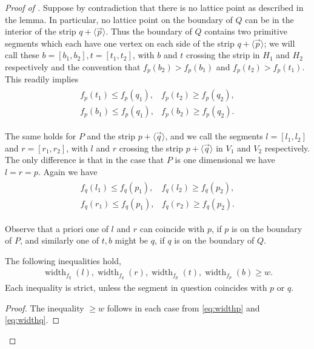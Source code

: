 \documentclass[12pt]{article}
\newcommand{\width}{\operatorname{width}}
\newcommand{\vecline}[1]{\langle \vec #1 \rangle}
\begin{document}
\begin{proof}[Proof of ]
Suppose by contradiction that there is no lattice point as described in the lemma. In particular, no lattice point on the boundary of $Q$ can be in the interior of the strip $q + \vecline p$.  Thus the boundary of $Q$ contains two primitive segments which each have one vertex on each side of the strip $q + \vecline p$; we will call these  $b=[b_1, b_2], t=[t_1, t_2]$, with $b$ and $t$ crossing the strip in $H_1$ and $H_2$ respectively and the convention that $f_p(b_2) >f_p(b_1)$ and $f_p(t_2) >f_p(t_1)$. This readily implies 
\begin{gather}
\label{eq:widthq}
\begin{array}{cc}
f_p(t_1) \leq f_p(q_1), &
f_p(t_2) \geq f_p(q_2), \\
f_p(b_1) \leq f_p(q_1), &
f_p(b_2) \geq f_p(q_2).
\end{array}
\end{gather}


The same holds for $P$ and the strip $p+\vecline q$, and we call the segments 
$l=[l_1, l_2]$ and $r=[r_1, r_2]$, with $l$ and $r$ crossing the strip $p + \vecline q$  in $V_1$ and $ V_2$ respectively. The only difference is that in the case that $P$ is one dimensional we have $l=r=p$.  Again we have
\begin{gather}
\label{eq:widthp}
\begin{array}{cc}
f_q(l_1) \leq f_q(p_1), &
f_q(l_2) \geq f_q(p_2), \\
f_q(r_1) \leq f_q(p_1),&
f_q(r_2) \geq f_q(p_2).
\end{array}
\end{gather}

Observe that a priori one of $l$ and $r$ can coincide with $p$, if $p$ is on the boundary of $P$, and similarly one of $t,b$ might be $q$, if $q$ is on the boundary of $Q$. 


\begin{claim}\label{claim:width}
The following inequalities hold, 
\begin{align*}
\width_{f_q}(l) , 
\width_{f_q}(r) ,
\width_{f_p}(t) ,
\width_{f_p}(b) \geq w.
\end{align*}
Each inequality is strict, unless the segment in question coincides with $p$ or $q$.
\end{claim}

\begin{proof}
The inequality $\geq w$ follows in each case from \eqref{eq:widthp} and \eqref{eq:widthq}.


\end{proof}
\end{proof}
\end{document}

